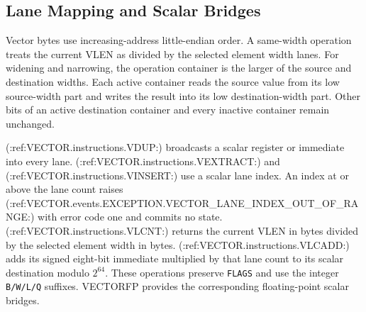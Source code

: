 \subsection{Lane Mapping and Scalar Bridges}

Vector bytes use increasing-address little-endian order.  A same-width
operation treats the current VLEN as divided by the selected element width lanes.
For widening and narrowing, the operation container is the larger of the
source and destination widths. Each
active container reads the source value from its low source-width part and
writes the result into its low destination-width part.  Other bits of an
active destination container and every inactive container remain unchanged.

(:ref:VECTOR.instructions.VDUP:) broadcasts a scalar register or immediate into
every lane. (:ref:VECTOR.instructions.VEXTRACT:) and (:ref:VECTOR.instructions.VINSERT:) use a scalar lane index. An
index at or above the lane count raises (:ref:VECTOR.events.EXCEPTION.VECTOR_LANE_INDEX_OUT_OF_RANGE:) with
error code one and commits no state.  (:ref:VECTOR.instructions.VLCNT:) returns the current VLEN in bytes
divided by the selected element width in bytes.  (:ref:VECTOR.instructions.VLCADD:) adds its
signed eight-bit immediate multiplied by that lane count to its scalar
destination modulo $2^{64}$. These operations preserve \texttt{FLAGS} and
use the integer \texttt{B/W/L/Q} suffixes. VECTORFP provides the corresponding
floating-point scalar bridges.
